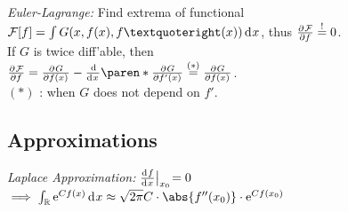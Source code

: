 \emph{Euler-Lagrange:}
Find extrema of functional $\mathcal F[f] = \int G(x, f(x), f’(x)) \diff x$,
thus $\pderiv{\mathcal F}{f} \overset!= 0$.
\\
If $G$ is twice diff'able, then
\\
$\pderiv{\mathcal F}{f} = \pderiv{G}{f(x)} - \deriv{}{x} \paren*{ \pderiv{G}{f'(x)} } \overset{(\ast)}= \pderiv{G}{f(x)}$.
\\
$(\ast)$ : when $G$ does not depend on $f'$.

\subsection{Approximations}

\emph{Laplace Approximation:}
$\deriv{f}{x} \big\vert_{x_0} \!= 0$\\
$\implies \int_{\mathbb R} \eu^{C f(x)} \diff x \approx \sqrt{2\pi} C \cdot \abs{f''(x_0)} \cdot \eu^{C f(x_0)}$

